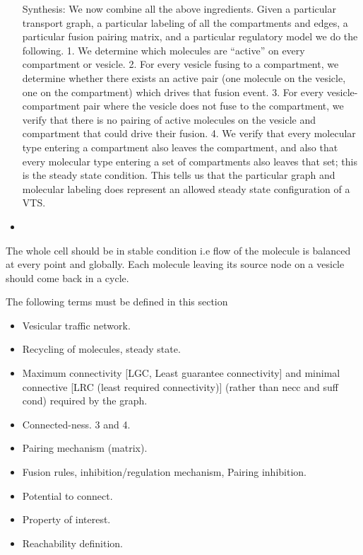 \begin{itemize}
Synthesis: We now combine all the above ingredients. Given a particular
transport graph, a particular labeling of all the compartments and edges,
a particular fusion pairing matrix, and a particular regulatory model we do
the following. 1. We determine which molecules are “active” on every
compartment or vesicle. 2. For every vesicle fusing to a compartment, we
determine whether there exists an active pair (one molecule on the vesicle,
one on the compartment) which drives that fusion event. 3. For every
vesicle-compartment pair where the vesicle does not fuse to the
compartment, we verify that there is no pairing of active molecules on the
vesicle and compartment that could drive their fusion. 4. We verify that
every molecular type entering a compartment also leaves the compartment,
and also that every molecular type entering a set of compartments also
leaves that set; this is the steady state condition. This tells us that the
particular graph and molecular labeling does represent an allowed steady
state configuration of a VTS.

\item {}
\end{itemize}


The whole cell should be in stable condition i.e flow of the molecule
is balanced at every point and globally. Each molecule leaving its
source node on a vesicle should come back in a cycle.

The following terms must be defined in this section

\begin{itemize}
\item Vesicular traffic network.
\item Recycling of molecules, steady state.
\item Maximum connectivity [LGC, Least guarantee connectivity] and minimal connective [LRC (least required connectivity)] (rather than necc and suff cond) required by the graph. 
\item Connected-ness. 3 and 4.
\item Pairing mechanism (matrix).
\item Fusion rules, inhibition/regulation mechanism, Pairing inhibition.
\item Potential to connect.
\item Property of interest.
\item Reachability definition.
\end{itemize}





